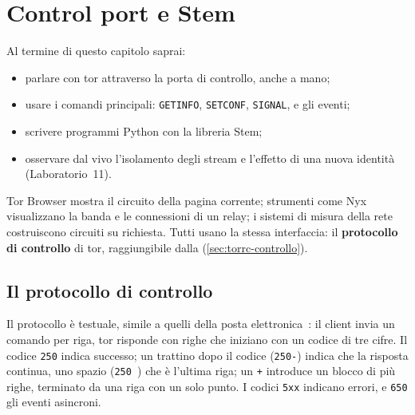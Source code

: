 \chapter{Control port e Stem}\label{cap:18-stem}

\begin{obiettivi}
Al termine di questo capitolo saprai:
\begin{itemize}[nosep]
  \item parlare con tor attraverso la porta di controllo, anche a mano;
  \item usare i comandi principali: \texttt{GETINFO}, \texttt{SETCONF}, \texttt{SIGNAL},  e gli eventi;
  \item scrivere programmi Python con la libreria Stem;
  \item osservare dal vivo l'isolamento degli stream e l'effetto di una nuova identità (Laboratorio~11).
\end{itemize}
\end{obiettivi}

Tor Browser mostra il circuito della pagina corrente; strumenti come Nyx visualizzano la banda e le connessioni di un relay; i sistemi di misura della rete costruiscono circuiti su richiesta. Tutti usano la stessa interfaccia: il \textbf{protocollo di controllo} di tor, raggiungibile dalla  (\cref{sec:torrc-controllo}).

\section{Il protocollo di controllo}\label{sec:stem-protocollo}

Il protocollo è testuale, simile a quelli della posta elettronica~: il client invia un comando per riga, tor risponde con righe che iniziano con un codice di tre cifre. Il codice \texttt{250} indica successo; un trattino dopo il codice (\texttt{250-}) indica che la risposta continua, uno spazio (\texttt{250 }) che è l'ultima riga; un \texttt{+} introduce un blocco di più righe, terminato da una riga con un solo punto. I codici \texttt{5xx} indicano errori, e \texttt{650} gli eventi asincroni.

